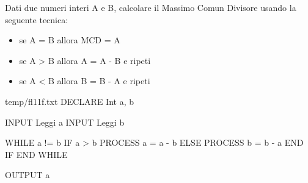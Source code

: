 \documentclass[11pt,fleqn]{book}
\begin{document}
\begin{esercizio}[2]
    Dati due numeri interi A e B, calcolare il Massimo Comun Divisore usando la seguente tecnica:
    \begin{itemize}[labelsep=0.3cm]
        \item se A = B allora MCD = A
        \item se A > B allora A = A - B e ripeti
        \item se A < B allora B = B - A e ripeti
    \end{itemize}
    \ifsoluzioni
        \solution
        
        \begin{filecontents*}{temp/fl11f.txt}
        DECLARE Int a, b

        INPUT Leggi a
        INPUT Leggi b

        WHILE a != b
            IF a > b
                PROCESS a = a - b
            ELSE
                PROCESS b = b - a
            END IF
        END WHILE

        OUTPUT a
        \end{filecontents*}

        \immediate{}
        
        \newpage

        \immediate{}
        
        \newpage
    \fi
\end{esercizio}
\end{document}
